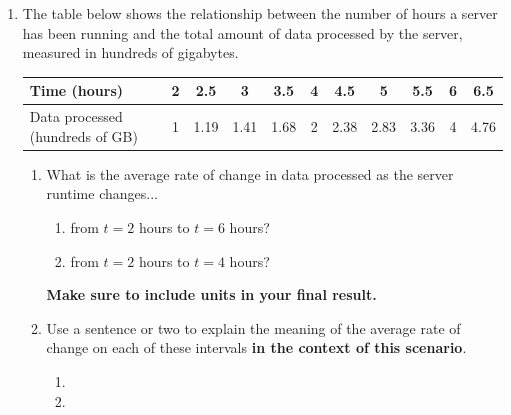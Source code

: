 \documentclass[11pt]{article}
\begin{document}
\begin{enumerate}

\item[\textbf{F1}.]
The table below shows the relationship between the number of hours a server has been running
and the total amount of data processed by the server, measured in hundreds of gigabytes.

\begin{center}
\begin{tabular}{| l | c | c | c | c | c | c | c | c | c | c |}
\hline
Time (hours) &
2 & 2.5 & 3 & 3.5 & 4 & 4.5 & 5 & 5.5 & 6 & 6.5 \\
\hline
Data processed (hundreds of GB) &
1 & 1.19 & 1.41 & 1.68 & 2 & 2.38 & 2.83 & 3.36 & 4 & 4.76 \\
\hline
\end{tabular}
\end{center}

\begin{enumerate}
    \item What is the average rate of change in data processed as the server runtime changes...

    \begin{enumerate}
    \item from $t=2$ hours to $t=6$ hours?
    \vfill
    \item from $t=2$ hours to $t=4$ hours?
    \vfill
    \end{enumerate}
    \textbf{Make sure to include units in your final result.}
    \vspace{.25in}

    \item Use a sentence or two to explain the meaning of the average rate of change on each of these intervals
    \textbf{in the context of this scenario}. 
    \begin{enumerate}
    \item
    \item
    \vfill
    \end{enumerate}
    

    \vfill
\end{enumerate}



\end{enumerate}
\end{document}
